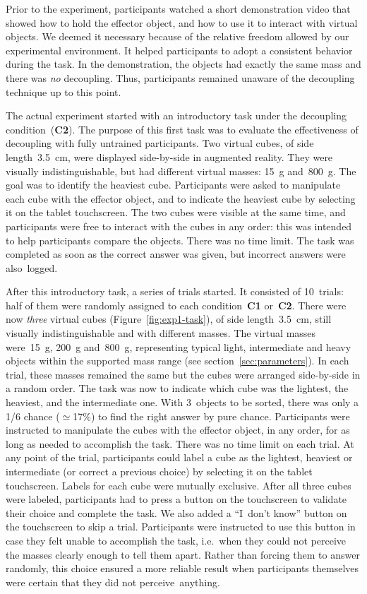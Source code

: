 \documentclass{vgtc}
\begin{document}
Prior to the experiment, participants watched a short demonstration video that showed how to hold the effector object, and how to use it to interact with virtual objects. We deemed it necessary because of the relative freedom allowed by our experimental environment. It helped participants to adopt a consistent behavior during the task. In the demonstration, the objects had exactly the same mass and there was \emph{no} decoupling. Thus, participants remained unaware of the decoupling technique up to this point.

The actual experiment started with an introductory task under the decoupling condition~(\textbf{C2}). The purpose of this first task was to evaluate the effectiveness of decoupling with fully untrained participants. Two virtual cubes, of side length~\SI{3.5}{\centi\meter}, were displayed side-by-side in augmented reality. They were visually \mbox{indistinguishable}, but had different virtual masses: \SI{15}{\gram} and~\SI{800}{\gram}. The goal was to identify the heaviest cube. Participants were asked to manipulate each cube with the effector object, and to indicate the heaviest cube by selecting it on the tablet touchscreen. The two cubes were visible at the same time, and participants were free to interact with the cubes in any order: this was intended to help participants compare the objects. There was no time limit. The task was completed as soon as the correct answer was given, but incorrect answers were also~logged.

After this introductory task, a series of trials started. It consisted of 10~trials: half of them were randomly assigned to each condition~\textbf{C1} or~\textbf{C2}. There were now \emph{three} virtual cubes (Figure~\ref{fig:exp1-task}), of side length~\SI{3.5}{\centi\meter}, still visually indistinguishable and with different masses. The virtual masses were~\SI{15}{\gram}, \SI{200}{\gram} and~\SI{800}{\gram}, representing typical light, intermediate and heavy objects within the supported mass range (see section~\ref{sec:parameters}). In each trial, these masses remained the same but the cubes were arranged side-by-side in a random order. The task was now to indicate which cube was the lightest, the heaviest, and the intermediate one. With 3~objects to be sorted, there was only a 1/6 chance ($\simeq$17\%) to find the right answer by pure chance. Participants were instructed to manipulate the cubes with the effector object, in any order, for as long as needed to accomplish the task. There was no time limit on each trial. At any point of the trial, participants could label a cube as the lightest, heaviest or intermediate (or correct a previous choice) by selecting it on the tablet touchscreen. Labels for each cube were mutually exclusive. After all three cubes were labeled, participants had to press a button on the touchscreen to validate their choice and complete the task. We also added a ``I~don't know'' button on the touchscreen to skip a trial. Participants were instructed to use this button in case they felt unable to accomplish the task, i.e.~when they could not perceive the masses clearly enough to tell them apart. Rather than forcing them to answer randomly, this choice ensured a more reliable result when participants themselves were certain that they did not \mbox{perceive anything}.
\end{document}
